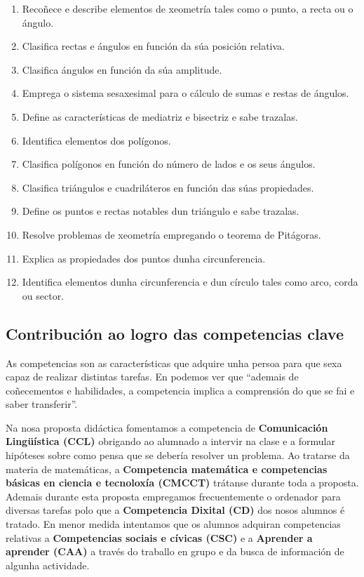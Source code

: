 \begin{enumerate}[label=\bfseries Est\arabic*]
 \item\label{est1} Recoñece e describe elementos de xeometría tales como o punto, a recta ou o ángulo.
 \item\label{est2} Clasifica rectas e ángulos en función da súa posición relativa.
 \item\label{est3} Clasifica ángulos en función da súa amplitude.
 \item\label{est4} Emprega o sistema sesaxesimal para o cálculo de sumas e restas de ángulos.
 \item\label{est5} Define as características de mediatriz e bisectriz e sabe trazalas.
 \item\label{est6} Identifica elementos dos polígonos.
 \item\label{est7} Clasifica polígonos en función do número de lados e os seus ángulos.
 \item\label{est8} Clasifica triángulos e cuadriláteros en función das súas propiedades.
 \item\label{est9} Define os puntos e rectas notables dun triángulo e sabe trazalas.
 \item\label{est10} Resolve problemas de xeometría empregando o teorema de Pitágoras.
 \item\label{est11} Explica as propiedades dos puntos dunha circunferencia.
 \item\label{est12} Identifica elementos dunha circunferencia e dun círculo tales como arco, corda ou sector.
\end{enumerate}

\subsection{Contribución ao logro das competencias clave}\label{sec-comp}
As competencias son as características que adquire unha persoa para que sexa capaz de realizar distintas tarefas. En \cite[p.~3]{aprsuperior} podemos ver que ``ademais de coñecementos e habilidades, a competencia implica a comprensión do que se fai e saber transferir''.

Na nosa proposta didáctica fomentamos a competencia de \textbf{Comunicación Lingüística (CCL)} obrigando ao alumnado a intervir na clase e a formular hipóteses sobre como pensa que se debería resolver un problema. Ao tratarse da materia de matemáticas, a \textbf{Competencia matemática e competencias básicas en ciencia e tecnoloxía (CMCCT)} trátanse durante toda a proposta. Ademais durante esta proposta empregamos frecuentemente o ordenador para diversas tarefas polo que a \textbf{Competencia Dixital (CD)} dos nosos alumnos é tratado. En menor medida intentamos que os alumnos adquiran competencias relativas a \textbf{Competencias sociais e cívicas (CSC)} e a \textbf{Aprender a aprender (CAA)} a través do traballo en grupo e da busca de información de algunha actividade.


